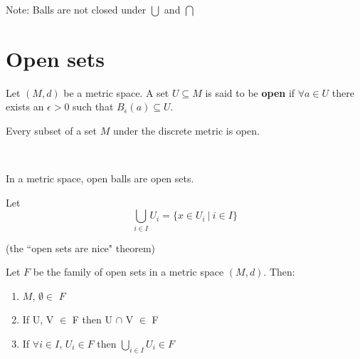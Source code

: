 Note: Balls are not closed under $\bigcup$ and $\bigcap$

\section{Open sets}
\begin{definition}
Let $(M,d)$ be a metric space. A set $U \subseteq M$ is said to be {\bf open} if $\forall a\in U$ there exists an $\epsilon >0$ such that $B_\epsilon (a) \subseteq U$.
\end{definition}

\begin{example} Every subset of a set $M$ under the discrete metric is open.\end{example}

\mbox{ }

\begin{smallfact}
In a metric space, open balls are open sets.
\end{smallfact}

\begin{definition}
Let
\[\bigcup_{i \in I} U_i = \{x \in U_i\ |\ i \in I\}\]
\end{definition}
\pagebreak

\begin{theorem} (the ``open sets are nice" theorem)

Let $F$ be the family of open sets in a metric space $(M,d)$. Then:
\begin{enumerate}
\item $M$, $\emptyset \in$ $F$
\item If U, V $\in$ F then U $\cap$ V $\in$ F
\item If $\forall i \in I$, $U_i \in F$ then $\bigcup_{i \in I} U_i \in F$
\end{enumerate}
\end{theorem}

